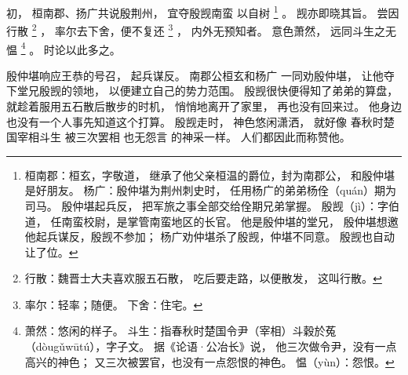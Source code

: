 
\switchcolumn*[\section{}]

初，
桓南郡、扬广共说殷荆州，
宜夺殷觊南蛮
以自树%
\footnote{%
    桓南郡：桓玄，字敬道，
            继承了他父亲桓温的爵位，封为南郡公，
            和殷仲堪是好朋友。
    杨广：殷仲堪为荆州刺史时，
          任用杨广的弟弟杨佺（quán）期为司马。
          殷仲堪起兵反，
          把军旅之事全部交给佺期兄弟掌握。
    殷觊（jì）：字伯道，
                任南蛮校尉，是掌管南蛮地区的长官。
                他是殷仲堪的堂兄，
                殷仲堪想邀他起兵谋反，殷觊不参加；
                杨广劝仲堪杀了殷觊，仲堪不同意。
                殷觊也自动让了位。
}%
。
觊亦即晓其旨。
尝因行散%
\footnote{%
    行散：魏晋士大夫喜欢服五石散，
          吃后要走路，以便散发，
          这叫行散。
}%
，
率尔去下舍，便不复还%
\footnote{%
    率尔：轻率；随便。
    下舍：住宅。
}%
，
内外无预知者。
意色萧然，
远同斗生之无愠%
\footnote{%
    萧然：悠闲的样子。
    斗生：指春秋时楚国令尹（宰相）斗穀於菟（dòugǔwūtú），字子文。
          据《论语·公冶长》说，
          他三次做令尹，没有一点高兴的神色；
          又三次被罢官，也没有一点怨恨的神色。
    愠（yùn）：怨恨。
}%
。
时论以此多之。

\switchcolumn

殷仲堪响应王恭的号召，
起兵谋反。
南郡公桓玄和杨广
一同劝殷仲堪，
让他夺下堂兄殷觊的领地，
以便建立自己的势力范围。
殷觊很快便得知了弟弟的算盘，
就趁着服用五石散后散步的时机，
悄悄地离开了家里，
再也没有回来过。
他身边也没有一个人事先知道这个打算。
殷觊走时，
神色悠闲潇洒，
就好像
春秋时楚国宰相斗生
被三次罢相
也无怨言
的神采一样。
人们都因此而称赞他。

